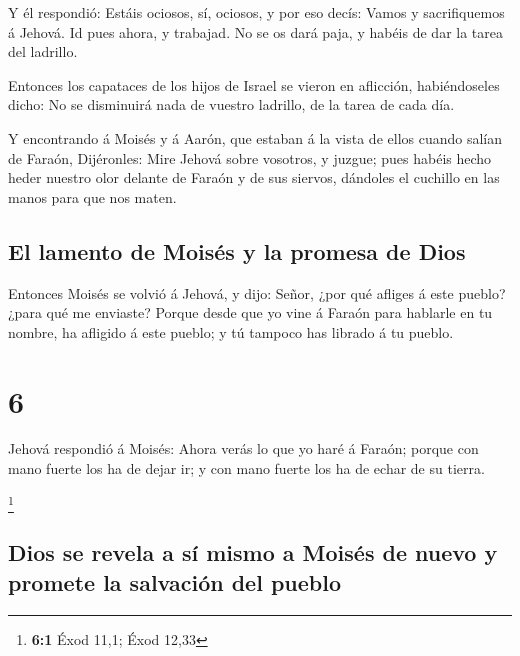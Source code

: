  Y él respondió: Estáis ociosos, sí, ociosos, y por eso
decís: Vamos y sacrifiquemos á Jehová.  Id pues ahora, y
trabajad. No se os dará paja, y habéis de dar la tarea del ladrillo.

 Entonces los capataces de los hijos de Israel se vieron
en aflicción, habiéndoseles dicho: No se disminuirá nada de vuestro
ladrillo, de la tarea de cada día.

 Y encontrando á Moisés y á Aarón, que estaban á la vista
de ellos cuando salían de Faraón,  Dijéronles: Mire
Jehová sobre vosotros, y juzgue; pues habéis hecho heder nuestro olor
delante de Faraón y de sus siervos, dándoles el cuchillo en las manos
para que nos maten.

\hypertarget{el-lamento-de-moisuxe9s-y-la-promesa-de-dios}{%
\subsection{El lamento de Moisés y la promesa de
Dios}\label{el-lamento-de-moisuxe9s-y-la-promesa-de-dios}}

 Entonces Moisés se volvió á Jehová, y dijo: Señor, ¿por
qué afliges á este pueblo? ¿para qué me enviaste?  Porque
desde que yo vine á Faraón para hablarle en tu nombre, ha afligido á
este pueblo; y tú tampoco has librado á tu pueblo.

\hypertarget{section-5}{%
\section{6}\label{section-5}}

 Jehová respondió á Moisés: Ahora verás lo que yo haré á
Faraón; porque con mano fuerte los ha de dejar ir; y con mano fuerte los
ha de echar de su tierra.

\footnote{\textbf{6:1} Éxod 11,1; Éxod 12,33}

\hypertarget{dios-se-revela-a-suxed-mismo-a-moisuxe9s-de-nuevo-y-promete-la-salvaciuxf3n-del-pueblo}{%
\subsection{Dios se revela a sí mismo a Moisés de nuevo y promete la
salvación del
pueblo}\label{dios-se-revela-a-suxed-mismo-a-moisuxe9s-de-nuevo-y-promete-la-salvaciuxf3n-del-pueblo}}

